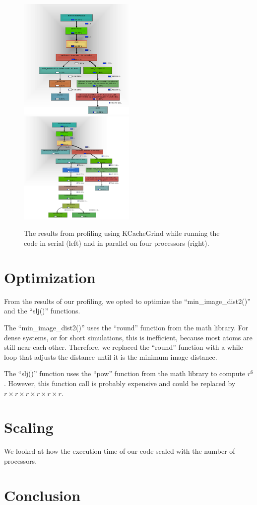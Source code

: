 \documentclass[10pt]{article}
\begin{document}
\begin{figure}[htb]
\includegraphics[width=0.5\textwidth]{serial.png}
\includegraphics[width=0.5\textwidth]{mpi4procs.png}
\caption{The results from profiling using KCacheGrind while running the code in serial (left) and in parallel on four processors (right).}
\label{fig:profiling}
\end{figure}

\section{Optimization}
From the results of our profiling, we opted to optimize the ``min\_image\_dist2()'' and the ``slj()'' functions.

The ``min\_image\_dist2()'' uses the ``round'' function from the math library. 
%
For dense systems, or for short simulations, this is inefficient, because most atoms are still near each other.
%
Therefore, we replaced the ``round'' function with a while loop that adjusts the distance until it is the minimum image distance.

The ``slj()'' function uses the ``pow'' function from the math library to compute $r^6$.
%
However, this function call is probably expensive and could be replaced by $r \times r \times r \times r \times r \times r$.
%

\section{Scaling}
We looked at how the execution time of our code scaled with the number of processors.

\section{Conclusion}
\end{document}
